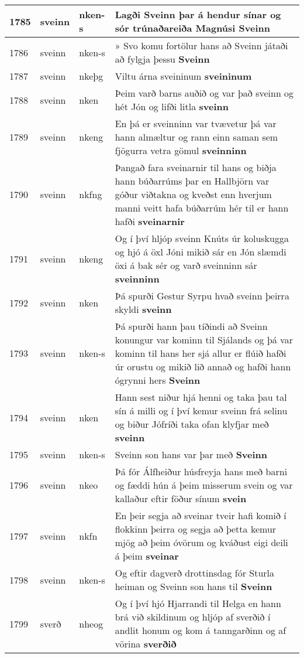 \documentclass{article}
\begin{document}
\begin{longtable}{p{1cm}|p{1cm}|p{1cm}|p{13cm}}
\hline
1785&sveinn&nken-s&Lagði Sveinn þar á hendur sínar og sór trúnaðareiða Magnúsi \textbf{Sveinn} \\
\hline
1786&sveinn&nken-s&» Svo komu fortölur hans að Sveinn játaði að fylgja þessu \textbf{Sveinn} \\
\hline
1787&sveinn&nkeþg&Viltu árna sveininum \textbf{sveininum} \\
\hline
1788&sveinn&nken&Þeim varð barns auðið og var það sveinn og hét Jón og lifði litla \textbf{sveinn} \\
\hline
1789&sveinn&nkeng&En þá er sveinninn var tvævetur þá var hann almæltur og rann einn saman sem fjögurra vetra gömul \textbf{sveinninn} \\
\hline
1790&sveinn&nkfng&Þangað fara sveinarnir til hans og biðja hann búðarrúms þar en Hallbjörn var góður viðtakna og kveðst enn hverjum manni veitt hafa búðarrúm hér til er hann hafði \textbf{sveinarnir} \\
\hline
1791&sveinn&nkeng&Og í því hljóp sveinn Knúts úr koluskugga og hjó á öxl Jóni mikið sár en Jón slæmdi öxi á bak sér og varð sveinninn sár \textbf{sveinninn} \\
\hline
1792&sveinn&nken&Þá spurði Gestur Syrpu hvað sveinn þeirra skyldi \textbf{sveinn} \\
\hline
1793&sveinn&nken-s&Þá spurði hann þau tíðindi að Sveinn konungur var kominn til Sjálands og þá var kominn til hans her sjá allur er flúið hafði úr orustu og mikið lið annað og hafði hann ógrynni hers \textbf{Sveinn} \\
\hline
1794&sveinn&nken&Hann sest niður hjá henni og taka þau tal sín á milli og í því kemur sveinn frá selinu og biður Jófríði taka ofan klyfjar með \textbf{sveinn} \\
\hline
1795&sveinn&nken-s&Sveinn son hans var þar með \textbf{Sveinn} \\
\hline
1796&sveinn&nkeo&Þá fór Álfheiður húsfreyja hans með barni og fæddi hún á þeim misserum svein og var kallaður eftir föður sínum \textbf{svein} \\
\hline
1797&sveinn&nkfn&En þeir segja að sveinar tveir hafi komið í flokkinn þeirra og segja að þetta kemur mjög að þeim óvörum og kváðust eigi deili á þeim \textbf{sveinar} \\
\hline
1798&sveinn&nken-s&Og eftir dagverð drottinsdag fór Sturla heiman og Sveinn son hans til \textbf{Sveinn} \\
\hline
1799&sverð&nheog&Og í því hjó Hjarrandi til Helga en hann brá við skildinum og hljóp af sverðið í andlit honum og kom á tanngarðinn og af vörina \textbf{sverðið} \\

\end{longtable}
\end{document}
